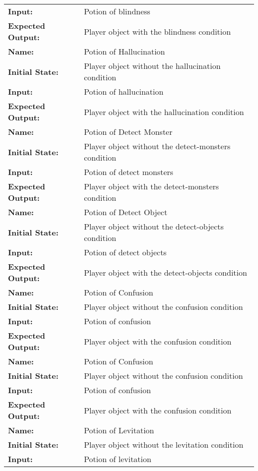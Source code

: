 \documentclass[12pt, titlepage]{article}
\begin{document}
\begin{center}
\begin{longtable}{ l | p{10cm} }
				\textbf{Input:} & Potion of blindness\\
				\textbf{Expected Output:} & Player object with the blindness condition\\
				\hline
				\textbf{Name:} & Potion of Hallucination\\
				\textbf{Initial State:} & Player object without the hallucination condition\\
				\textbf{Input:} & Potion of hallucination\\
				\textbf{Expected Output:} & Player object with the hallucination condition\\
				\hline
				\textbf{Name:} & Potion of Detect Monster\\
				\textbf{Initial State:} & Player object without the detect-monsters condition\\
				\textbf{Input:} & Potion of detect monsters\\
				\textbf{Expected Output:} & Player object with the detect-monsters condition\\
				\hline
				\textbf{Name:} & Potion of Detect Object\\
				\textbf{Initial State:} & Player object without the detect-objects condition\\
				\textbf{Input:} & Potion of detect objects\\
				\textbf{Expected Output:} & Player object with the detect-objects condition\\
				\hline
				\textbf{Name:} & Potion of Confusion\\
				\textbf{Initial State:} & Player object without the confusion condition\\
				\textbf{Input:} & Potion of confusion\\
				\textbf{Expected Output:} & Player object with the confusion condition\\
				\hline
				\textbf{Name:} & Potion of Confusion\\
				\textbf{Initial State:} & Player object without the confusion condition\\
				\textbf{Input:} & Potion of confusion\\
				\textbf{Expected Output:} & Player object with the confusion condition\\
				\hline
				\textbf{Name:} & Potion of Levitation\\
				\textbf{Initial State:} & Player object without the levitation condition\\
				\textbf{Input:} & Potion of levitation\\

\end{longtable}
\end{center}
\end{document}
